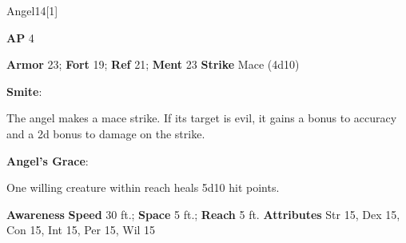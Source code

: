 \begin{monsection}{Angel}{14}[1]
\vspace{-1em}\vspace{-1em}
\begin{spellcontent}
\begin{spelltargetinginfo}
{\textbf{AP} 4}

\pari \textbf{Armor} 23;
\textbf{Fort} 19;
\textbf{Ref} 21;
\textbf{Ment} 23
\pari \textbf{Strike} Mace  (4d10)



\end{spelltargetinginfo}


\begin{spelleffects}

\pari
\textbf{Smite}:

The angel makes a mace strike.
If its target is evil, it gains a  bonus to accuracy and a \plus2d bonus to damage on the strike.




\vspace{0.5em}
\pari
\textbf{Angel's Grace}:

One willing creature within reach heals 5d10 hit points.




\end{spelleffects}

\end{spellcontent}

\begin{monsterfooter}
\pari \textbf{Awareness} 
\pari \textbf{Speed} 30 ft.;
\textbf{Space} 5 ft.;
\textbf{Reach} 5 ft.
\pari \textbf{Attributes}
Str 15,
Dex 15,
Con 15,
Int 15,
Per 15,
Wil 15
\end{monsterfooter}
\end{monsection}



